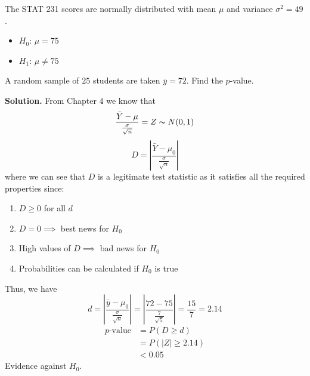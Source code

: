 \begin{exbox}
    \begin{example}
        The STAT 231 scores are normally distributed with mean $ \mu $
        and variance $ \sigma^2=49 $.
        \begin{itemize}
            \item $ H_0 $: $ \mu=75 $
            \item $ H_1 $: $ \mu\neq 75 $
        \end{itemize}
        A random sample of $ 25 $ students are taken $ \bar{y}=72 $.
        Find the $ p $-value.

        \textbf{Solution.}
        From Chapter $ 4 $ we know that
        \[ \frac{\bar{Y}-\mu}{\frac{\sigma}{\sqrt{n}}} =Z \thicksim N(0,1) \]
        \[ D=\left|\frac{\bar{Y}-\mu_0}{\frac{\sigma}{\sqrt{n}}}\right| \]
        where we can see that $ D $ is a legitimate test statistic as
        it satisfies all the required properties since:
        \begin{enumerate}
            \item $ D\geqslant 0 $ for all $ d $
            \item $ D=0\implies $ best news for $ H_0 $
            \item High values of $ D \implies $ bad news for $ H_0 $
            \item Probabilities can be calculated if $ H_0 $ is true
        \end{enumerate}
        Thus, we have
        \[ d=\left|\frac{\bar{y}-\mu_0}{\frac{\sigma}{\sqrt{n}}}\right|=
            \left|\frac{72-75}{\frac{7}{\sqrt{5}}} \right|=\frac{15}{7} =2.14 \]
        \begin{align*}
            p\text{-value}
             & =P(D\geqslant d)      \\
             & =P(|Z|\geqslant 2.14) \\
             & <0.05
        \end{align*}
        Evidence against $ H_0 $.
    \end{example}
\end{exbox}

